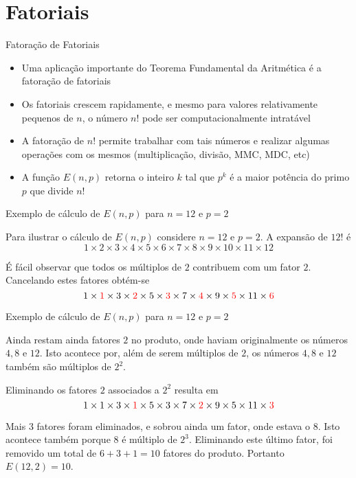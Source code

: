 \section{Fatoriais}

\begin{frame}[fragile]{Fatoração de Fatoriais}

    \begin{itemize}
        \item Uma aplicação importante do Teorema Fundamental da Aritmética é a fatoração de
            fatoriais

        \item Os fatoriais crescem rapidamente, e mesmo para valores relativamente pequenos de $n$, 
            o número $n!$ pode ser computacionalmente intratável

        \item A fatoração de $n!$ permite trabalhar com tais números e realizar algumas operações 
            com os mesmos (multiplicação, divisão, MMC, MDC, etc)

        \item A função $E(n,p)$ retorna o inteiro $k$ tal que $p^k$ é a maior potência do primo 
            $p$ que divide $n!$
    \end{itemize}

\end{frame}

\begin{frame}[fragile]{Exemplo de cálculo de $E(n, p)$ para $n = 12$ e $p = 2$}

Para ilustrar o cálculo de $E(n,p)$ considere $n = 12$ e $p = 2$. A expansão de $12!$ é 
$$
        1 \times 2 \times 3 \times 4 \times 5 \times 6 \times 7 \times 8 \times 9 \times 10 \times 11 \times 12
$$

É fácil observar que todos os múltiplos de $2$ contribuem com um fator $2$. Cancelando estes fatores obtém-se
$$
        1 \times \textcolor{red}{1} \times 3 \times \textcolor{red}{2} \times 5 \times \textcolor{red}{3} \times 7 \times \textcolor{red}{4} \times 9 \times \textcolor{red}{5} \times 11 \times \textcolor{red}{6}
$$

\end{frame}

\begin{frame}[fragile]{Exemplo de cálculo de $E(n, p)$ para $n = 12$ e $p = 2$}

Ainda restam ainda fatores $2$ no produto, onde haviam originalmente os números $4, 8$ e $12$. Isto acontece por, além de serem múltiplos de $2$, os números $4, 8$ e $12$ também são múltiplos de $2^2$. 

Eliminando os fatores $2$ associados a $2^2$ resulta em
$$
        1 \times 1 \times 3 \times \textcolor{red}{1} \times 5 \times 3 \times 7 \times \textcolor{red}{2} \times 9 \times 5 \times 11 \times \textcolor{red}{3}
$$

Mais $3$ fatores foram eliminados, e sobrou ainda um fator, onde estava o $8$. Isto acontece também porque 8 é múltiplo de $2^3$. Eliminando este último fator, foi removido um total de $6 + 3 + 1 = 10$ fatores do produto.  Portanto $E(12,2) = 10$.

\end{frame}

